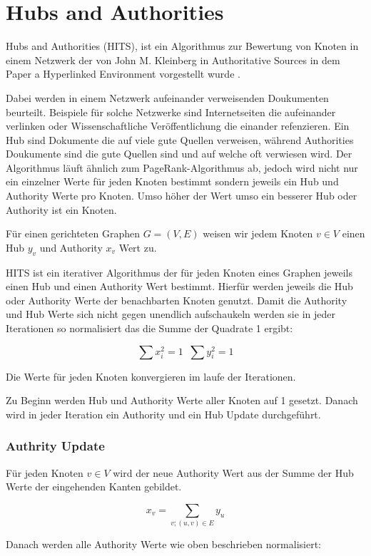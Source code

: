 \section{Hubs and Authorities}

Hubs and Authorities (HITS), ist ein Algorithmus zur Bewertung von Knoten in einem Netzwerk der von John M. Kleinberg in Authoritative Sources in dem Paper a Hyperlinked Environment vorgestellt wurde \cite{Kleinberg98authoritativesources}.

Dabei werden in einem Netzwerk aufeinander verweisenden Doukumenten beurteilt. Beispiele für solche Netzwerke sind Internetseiten die aufeinander
verlinken oder Wissenschaftliche Veröffentlichung die einander refenzieren. Ein Hub sind Dokumente die auf viele gute Quellen verweisen, während
Authorities Doukumente sind die gute Quellen sind und auf welche oft verwiesen wird. Der Algorithmus läuft ähnlich zum PageRank-Algorithmus ab, 
jedoch wird nicht nur ein einzelner Werte für jeden Knoten bestimmt sondern jeweils ein Hub und Authority Werte pro Knoten. Umso höher der Wert umso
ein besserer Hub oder Authority ist ein Knoten.

Für einen gerichteten Graphen $G = (V, E)$ weisen wir jedem Knoten $v \in V$ einen Hub $y_{v}$ und Authority $x_{v}$ Wert zu.

HITS ist ein iterativer Algorithmus der für jeden Knoten eines Graphen jeweils einen Hub und einen Authority Wert bestimmt. Hierfür 
werden jeweils die Hub oder Authority Werte der benachbarten Knoten genutzt. Damit die Authority und Hub Werte sich nicht gegen
unendlich aufschaukeln werden sie in jeder Iterationen so normalisiert das die Summe der Quadrate 1 ergibt:

\[ \sum x_{i}^{2} = 1 \; \; \sum y_{i}^{2} = 1 \]

Die Werte für jeden Knoten konvergieren im laufe der Iterationen.

Zu Beginn werden Hub und Authority Werte aller Knoten auf 1 gesetzt. Danach wird in jeder Iteration ein Authority und ein Hub Update durchgeführt.
\subsubsection{Authrity Update}

Für jeden Knoten $ v \in V $ wird der neue Authority Wert aus der Summe der Hub Werte der eingehenden Kanten gebildet.

\[ x_{v} = \sum_{v; (u, v) \in E} y_{u} \]

Danach werden alle Authority Werte wie oben beschrieben normalisiert:

